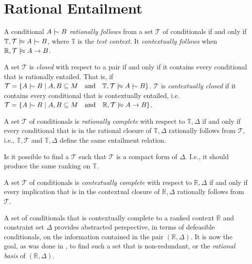 
\chapter{Rational Entailment}
\begin{definition}
	A conditional $A \twiddle B$ \emph{rationally follows} from a set $\mathcal{T}$ of conditionals if and only if
	$\mathbb{T}, \mathcal{T}\dentails A \twiddle B$, where $\mathbb{T}$ is the \emph{test context}. It \emph{contextually
	follows} when $\mathbb{R}, \mathcal{T}\mid\hskip-0.40ex\approx A \rightarrow B$.
\end{definition}

\begin{definition}
	A set $\mathcal{T}$ is \emph{closed} with respect to a pair if and only if it contains every conditional that is
	rationally entailed. That is, if
	$\mathcal{T}= \{A \twiddle B \mid A,B \subseteq M \tand \mathbb{T},\mathcal{T}\dentails A \twiddle B\}$. $\mathcal{T}$
	is \emph{contextually closed} if it contains every conditional that is contextually entailed, i.e.
	$\mathcal{T}= \{A \twiddle B \mid A,B \subseteq M \tand \mathbb{R}, \mathcal{T}\dentails A \rightarrow B\}$.
\end{definition}

\begin{definition}
	A set $\mathcal{T}$ of conditionals is \emph{rationally complete} with respect to $\mathbb{T},\Delta$ if and only if
	every conditional that is in the rational closure of $\mathbb{T}, \Delta$ rationally follows from $\mathcal{T}$, i.e.,
	$\mathbb{T},\mathcal{T}$ and $\mathbb{T}, \Delta$ define the same entailment relation.
\end{definition}

Is it possible to find a $\mathcal{T}$ such that $\mathcal{T}$ is a compact form of $\Delta$. I.e., it should produce the
same ranking on $\mathbb{T}$.

\begin{definition}
	A set $\mathcal{T}$ of conditionals is \emph{contextually complete} with respect to $\mathbb{R}, \Delta$ if and only
	if every implication that is in the contextual closure of $\mathbb{R}, \Delta$ rationally follows from $\mathcal{T}$.
\end{definition}

A set of conditionals that is contextually complete to a ranked context $\mathbb{R}$ and constraint set $\Delta$
provides abstracted perspective, in terms of defeasible conditionals, on the information contained in the pair
$(\mathbb{R}, \Delta )$. It is now the goal, as was done in , to find such a set that
is non-redundant, or the \textit{rational basis} of $(\mathbb{R},\Delta)$.